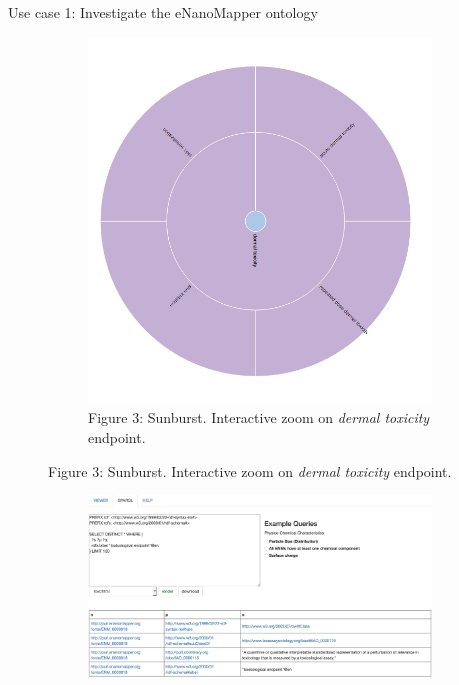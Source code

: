 \documentclass[final]{beamer}
\begin{document}
\begin{frame}{}
\begin{textblock}{63}
\begin{block}{Use case 1: Investigate the eNanoMapper ontology}
\begin{figure}
\begin{subfigure}[c]{0.35\textwidth}
            \includegraphics[scale=0.65,keepaspectratio]{onto-use-case-1b.png}
            \caption{Figure 3: Sunburst. Interactive zoom on \emph{dermal toxicity} endpoint.}
          \end{subfigure}
        \end{figure}
        \vspace{0.02\textwidth}
        \begin{figure}
          \hspace{-0.1\textwidth}
          \begin{subfigure}[c]{0.35\textwidth}
            \includegraphics[scale=0.5,keepaspectratio]{onto-use-case-1c.png}

\end{subfigure}
\end{figure}
\end{block}
\end{textblock}
\end{frame}
\end{document}
